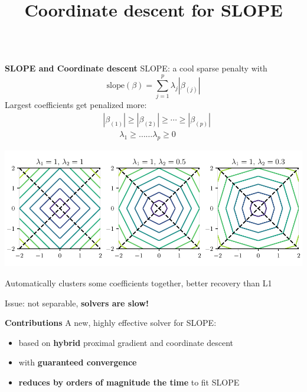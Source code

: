 \documentclass[english,final,t]{beamer}
\title{
	Coordinate descent for SLOPE}
\author{%
\texorpdfstring{
	\begin{minipage}{.98\linewidth}
	\begin{columns}%
		\column{.44\linewidth}
		\centering
		\Large Johan Larsson \\
		\large Lund University, Sweden \\[2em]
		\Large Mathurin Massias \\
		\large Univ. Lyon, Inria, CNRS, ENS de Lyon
		\column{.44\linewidth}
		\centering
		\Large Quentin Klopfenstein \\
		\large Université du Luxembourg \\[2em]
		\centering
		\Large Jonas Wallin \\
		\large Lund University, Sweden
	\end{columns}
	\vspace{1em}
\end{minipage}}{}
}
\begin{document}
\begin{frame}{}
\begin{columns}[t]
\begin{column}{.3\linewidth}
	\begin{block}{\textbf{\color{malgared} SLOPE and Coordinate descent}}
		\justifying
		SLOPE: a cool sparse penalty with \textbf{\color{malgared}{built-in coefficients clustering}}
		\begin{equation*}
			\text{slope}(\beta) = \sum_{j=1}^p \lambda_j|\beta_{(j)}|
		\end{equation*}
		\vspace{.2em}
		Largest coefficients get penalized more:
		\vspace{.2em}
		\begin{align*}
		&|\beta_{(1)}| \geq |\beta_{(2)}| \geq \cdots \geq |\beta_{(p)}|  \\[5mm]
		& \quad \quad \lambda_1 \geq \ldots \ldots \lambda_p \geq 0
		\end{align*}

		\vspace{.3em}

		\begin{center}
		\includegraphics[width=0.8\linewidth]{./images/slope_level_lines
		}
		\end{center}

		Automatically clusters some coefficients together, better recovery than L1
		\vspace{.4em}

		Issue: not separable, \textbf{\textcolor{malgared}{solvers are slow!}}

	\end{block}
	\begin{block}{\textbf{\color{malgared} Contributions}}
			A new, highly effective solver for SLOPE:
			\vspace{1em}
			\begin{itemize}
				\item  based on \textbf{\color{malgared}hybrid} proximal gradient and coordinate descent
				\item  with \textbf{\color{malgared}guaranteed convergence}
				\item  \textbf{\color{malgared}reduces by orders of magnitude the time}
				 to fit SLOPE
			\end{itemize}
	\end{block}


\end{column}
\end{columns}
\end{frame}
\end{document}
